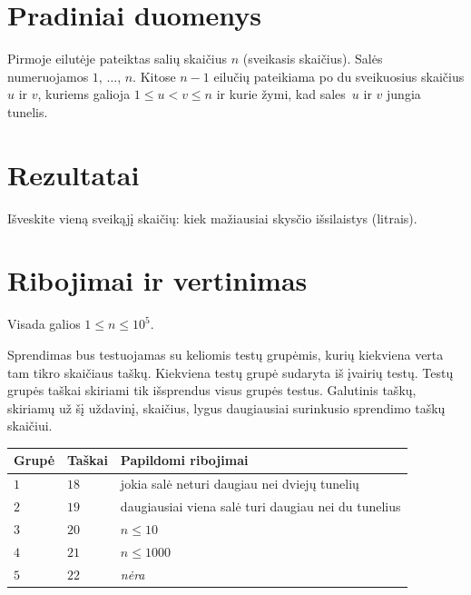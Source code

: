 \section*{Pradiniai duomenys}

Pirmoje eilutėje pateiktas salių skaičius $n$ (sveikasis skaičius).
Salės numeruojamos $1$, $\ldots$, $n$.
Kitose $n-1$ eilučių pateikiama po du sveikuosius skaičius $u$ ir $v$, kuriems galioja
$1\leq u < v \leq n$ %
ir kurie žymi, kad sales~$u$ ir $v$ jungia tunelis.

\section*{Rezultatai}

Išveskite vieną sveikąjį skaičių: kiek mažiausiai skysčio išsilaistys (litrais).

\section*{Ribojimai ir vertinimas}

Visada galios
$1\leq n\leq 10^5$. %

Sprendimas bus testuojamas su keliomis testų grupėmis, kurių kiekviena verta tam tikro skaičiaus taškų.
Kiekviena testų grupė sudaryta iš įvairių testų.
Testų grupės taškai skiriami tik išsprendus visus grupės testus.
Galutinis taškų, skiriamų už šį uždavinį, skaičius, lygus daugiausiai surinkusio sprendimo taškų skaičiui.

\medskip
\begin{tabular}{lll}
Grupė & Taškai & Papildomi ribojimai \\\hline
  $1$ & $18$ & jokia salė neturi daugiau nei dviejų tunelių\\
  $2$ & $19$ & daugiausiai viena salė turi daugiau nei du tunelius\\
  $3$ & $20$ & $n\leq 10$\\
  $4$ & $21$ & $n\leq 1000$\\
  $5$ & $22$ & \emph{nėra}
\end{tabular}

